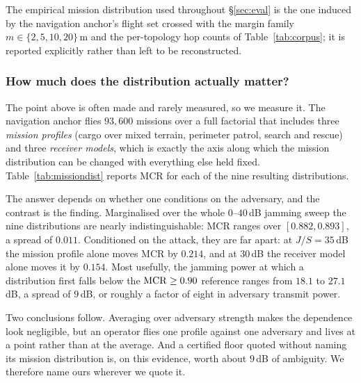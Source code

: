 The empirical mission distribution used throughout \S\ref{sec:eval} is the one
induced by the navigation anchor's flight set crossed with the margin family
$m\in\{2,5,10,20\}$\,m and the per-topology hop counts of
Table~\ref{tab:corpus}; it is reported explicitly rather than left to be
reconstructed.

\subsubsection*{How much does the distribution actually matter?}
\label{sec:missiondist}
The point above is often made and rarely measured, so we measure it. The
navigation anchor flies $93{,}600$ missions over a full factorial that includes
three \emph{mission profiles} (cargo over mixed terrain, perimeter patrol,
search and rescue) and three \emph{receiver models}, which is exactly the axis
along which the mission distribution can be changed with everything else held
fixed. Table~\ref{tab:missiondist} reports MCR for each of the nine resulting
distributions.

The answer depends on whether one conditions on the adversary, and the contrast
is the finding. Marginalised over the whole $0$--$40$\,dB jamming sweep the nine
distributions are nearly indistinguishable: MCR ranges over $[0.882,0.893]$, a
spread of $0.011$. Conditioned on the attack, they are far apart: at
$J/S=35$\,dB the mission profile alone moves MCR by $0.214$, and at $30$\,dB the
receiver model alone moves it by $0.154$. Most usefully, the jamming power at
which a distribution first falls below the $\mathrm{MCR}\ge0.90$ reference ranges from
$18.1$ to $27.1$\,dB, a spread of $9$\,dB, or roughly a factor of eight in
adversary transmit power.

Two conclusions follow. Averaging over adversary strength makes the dependence
look negligible, but an operator flies one profile against one adversary and
lives at a point rather than at the average. And a certified floor quoted
without naming its mission distribution is, on this evidence, worth about
$9$\,dB of ambiguity. We therefore name ours wherever we quote it.

\begin{table}[t]
\centering
\caption{MCR under the composed defence for each of nine mission distributions,
marginalised over the $0$--$40$\,dB jamming sweep, with Wilson $95\%$ intervals.
The marginal spread is small; the spread \emph{conditional} on attack strength
reaches $0.214$, and the $J/S$ at which MCR crosses $0.90$ spans $9$\,dB.
Provenance: simulation (physics-informed). Generated by
.}
\label{tab:missiondist}
\scriptsize
\renewcommand{\arraystretch}{1.02}

\end{table}

